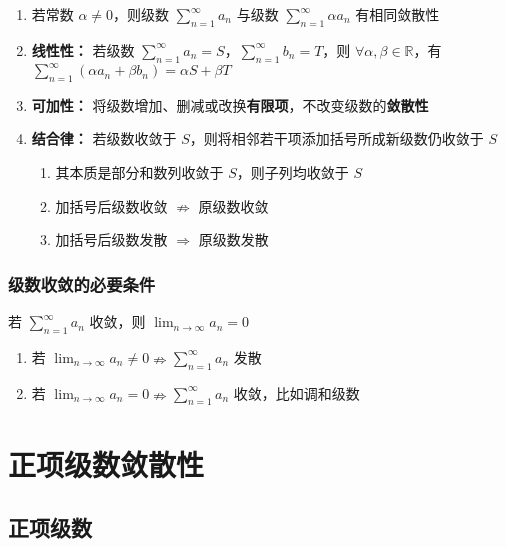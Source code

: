 \documentclass[lang = zh , final , oneside , openany , titlepage , zihao = -4 , linespread = 1.3 , baselineskip = false , cjk-font = windows , text-font = newtx , math-font = newtx , math-style = ISO , uppercase-greek = upright , integral-limits = false]{sjtureport}
\begin{document}
\begin{enumerate}
\def\labelenumi{\arabic{enumi}.}
\item
  若常数 \(\alpha \neq 0\)，则级数
  \(\displaystyle \sum_{n=1}^\infty a_n\) 与级数
  \(\displaystyle \sum_{n=1}^\infty \alpha a_n\) 有相同敛散性
\item
  \textbf{线性性：} 若级数
  \(\displaystyle \sum_{n=1}^\infty a_n = S\)，\(\displaystyle \sum_{n=1}^\infty b_n = T\)，则
  \(\forall \alpha , \beta\in \mathbb{R}\)，有
  \(\displaystyle \sum_{n=1}^\infty (\alpha a_n + \beta b_n) = \alpha S + \beta T\)
\item
  \textbf{可加性：}
  将级数增加、删减或改换\textbf{有限项}，不改变级数的\textbf{敛散性}
\item
  \textbf{结合律：} 若级数收敛于
  \(S\)，则将相邻若干项添加括号所成新级数仍收敛于 \(S\)

  \begin{enumerate}
  \item
    其本质是部分和数列收敛于 \(S\)，则子列均收敛于 \(S\)
  \item
    加括号后级数收敛 \(\nRightarrow\) 原级数收敛
  \item
    加括号后级数发散 \(\Rightarrow\) 原级数发散
  \end{enumerate}
\end{enumerate}

\subsubsection{级数收敛的必要条件}

\begin{theorem}
    若 \(\displaystyle \sum_{n=1}^\infty a_n\) 收敛，则
\(\displaystyle \lim_{n\to\infty} a_n = 0\)
\end{theorem}

\begin{enumerate}
\item
  若
  \(\displaystyle \lim_{n\to\infty} a_n \neq 0 \nRightarrow \displaystyle \sum_{n=1}^\infty a_n\)
  发散
\item
  若
  \(\displaystyle \lim_{n\to\infty} a_n = 0 \nRightarrow \displaystyle \sum_{n=1}^\infty a_n\)
  收敛，比如调和级数
\end{enumerate}

\section{正项级数敛散性}

\subsection{正项级数}
\end{document}
